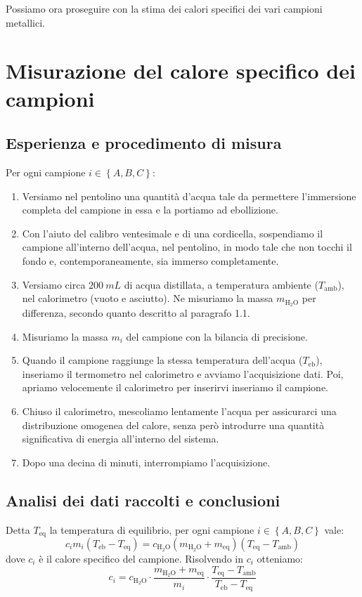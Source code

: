\documentclass{article}
\newcommand*{\acqua}{{\text{H}_2\text{O}}}
\begin{document}
Possiamo ora proseguire con la stima dei calori specifici dei vari campioni
metallici.

\pagebreak
\section{Misurazione del calore specifico dei campioni}

\subsection{Esperienza e procedimento di misura}

Per ogni campione $i\in\left\{A,B,C\right\}$:

\begin{enumerate}
    \item
        Versiamo nel pentolino una quantità d'acqua tale da permettere l'immersione
        completa del campione in essa e la portiamo ad ebollizione.
    \item
        Con l'aiuto del calibro ventesimale e di una cordicella, sospendiamo il
        campione all'interno dell'acqua, nel pentolino, in modo tale che non tocchi
        il fondo e, contemporaneamente, sia immerso completamente.
    \item
        Versiamo circa $\qty{200}{mL}$ di acqua distillata, a temperatura ambiente
        ($T_\text{amb}$), nel calorimetro (vuoto e asciutto).
        Ne misuriamo la massa $m_\acqua$ per differenza, secondo quanto descritto
        al paragrafo 1.1.
    \item
        Misuriamo la massa $m_i$ del campione con la bilancia di precisione.
    \item
        Quando il campione raggiunge la stessa temperatura dell'acqua ($T_\text{eb}$),
        inseriamo il termometro nel calorimetro e avviamo l'acquisizione dati.
        Poi, apriamo velocemente il calorimetro per inserirvi inseriamo il campione.
    \item
        Chiuso il calorimetro, mescoliamo lentamente l'acqua per assicurarci
        una distribuzione omogenea del calore, senza però introdurre una quantità
        significativa di energia all'interno del sistema.
    \item
        Dopo una decina di minuti, interrompiamo l'acquisizione.
\end{enumerate}

\subsection{Analisi dei dati raccolti e conclusioni}
Detta $T_\text{eq}$ la temperatura di equilibrio, per ogni campione
$i\in\left\{A,B,C\right\}$ vale:
\[
    c_i m_i (T_\text{eb} - T_\text{eq}) =
    c_\acqua (m_\acqua + m_\text{eq}) (T_\text{eq} - T_\text{amb})
\]
dove $c_i$ è il calore specifico del campione. Risolvendo in $c_i$ otteniamo:
\[
    c_i = c_\acqua\cdot\frac{m_\acqua + m_\text{eq}}{m_i}
          \cdot\frac{T_\text{eq} - T_\text{amb}}{T_\text{eb} - T_\text{eq}}
\]
\end{document}
